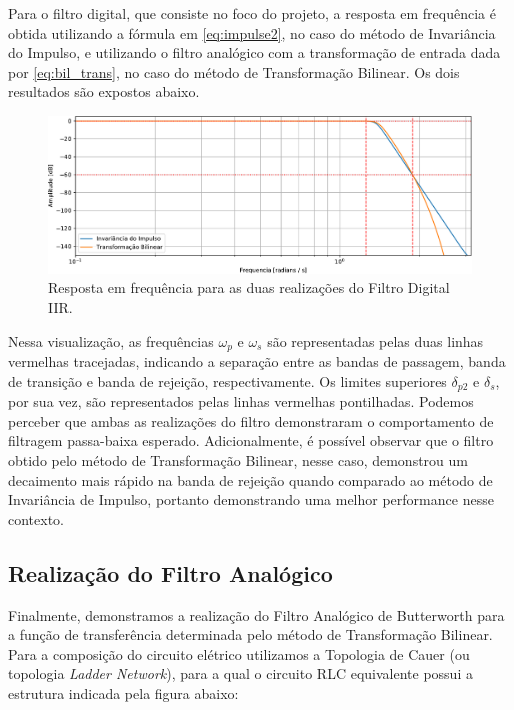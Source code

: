 \documentclass[a4paper,11pt]{article}
\numberwithin{figure}{section}
\numberwithin{equation}{section}
\numberwithin{table}{section}
\theoremstyle{definition}
\begin{document}
Para o filtro digital, que consiste no foco do projeto, a resposta em frequência é obtida utilizando a fórmula em \eqref{eq:impulse2}, no caso do método de Invariância do Impulso, e utilizando o filtro analógico com a transformação de entrada dada por \ref{eq:bil_trans}, no caso do método de Transformação Bilinear. Os dois resultados são expostos abaixo. 

\begin{figure}[ht] \centering
	\includegraphics[width=\textwidth]{digital}
	\caption{Resposta em frequência para as duas realizações do Filtro Digital IIR.}
	\label{fig:digital}
\end{figure}

Nessa visualização, as frequências $\omega_p$ e $\omega_s$ são representadas pelas duas linhas vermelhas tracejadas, indicando a separação entre as bandas de passagem, banda de transição e banda de rejeição, respectivamente. Os limites superiores $\delta_{p2}$ e $\delta_s$, por sua vez, são representados pelas linhas vermelhas pontilhadas. Podemos perceber que ambas as realizações do filtro demonstraram o comportamento de filtragem passa-baixa esperado. Adicionalmente, é possível observar que o filtro obtido pelo método de Transformação Bilinear, nesse caso, demonstrou um decaimento mais rápido na banda de rejeição quando comparado ao método de Invariância de Impulso, portanto demonstrando uma melhor performance nesse contexto.

\subsection{Realização do Filtro Analógico}

Finalmente, demonstramos a realização do Filtro Analógico de Butterworth para a função de transferência determinada pelo método de Transformação Bilinear. Para a composição do circuito elétrico utilizamos a Topologia de Cauer (ou topologia \textit{Ladder Network}), para a qual o circuito RLC equivalente possui a estrutura indicada pela figura abaixo:
\end{document}
